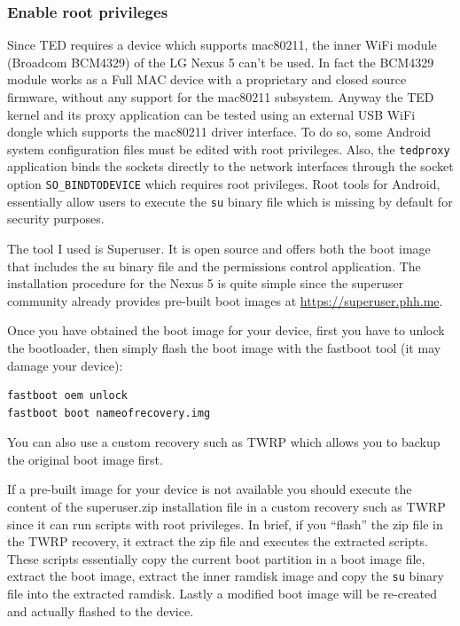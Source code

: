 \documentclass[a4paper]{article}
\begin{document}
\subsubsection{Enable root privileges}
Since TED requires a device which supports mac80211, 
the inner WiFi module (Broadcom BCM4329) of the LG Nexus 5 can't be used. 
In fact the BCM4329 module works as a Full MAC device with a proprietary and closed source firmware, 
without any support for the mac80211 subsystem.
Anyway the TED kernel and its proxy application can be tested using an external USB WiFi dongle which
 supports the mac80211 driver interface. To do so, some Android system configuration files must be
 edited with root privileges. Also, the \texttt{tedproxy} application binds the
sockets directly to the network interfaces through the socket option
\texttt{SO\_BINDTODEVICE} which requires root privileges. 
Root tools for Android, essentially allow users to execute the \texttt{su} binary
file which is missing by default for security purposes.

The tool I used is Superuser\cite{superuser}. It is
open source and offers both the boot image that includes the su binary file and the
permissions control application. The installation procedure for the Nexus 5 is
quite simple since the superuser community already provides pre-built boot
images at \url{https://superuser.phh.me}. 

Once you have obtained the boot image for your device, first you have to unlock the bootloader, then simply
 flash the boot image with the fastboot tool (it may damage your device):

\begin{lstlisting}
fastboot oem unlock
fastboot boot nameofrecovery.img
\end{lstlisting}
You can also use a custom recovery such as
TWRP\cite{twrp} which allows you to backup the original boot image
first. 

If a pre-built image for your device is not available you should execute the
content of the superuser.zip installation file in a custom recovery such as
TWRP since it can run scripts with root privileges. In brief, if you ``flash''
the zip file in the TWRP recovery, it extract the zip file and executes the
extracted scripts. These scripts essentially copy the current boot partition in
a boot image file, extract the boot image, extract the inner ramdisk image and copy
the \texttt{su} binary file into the extracted ramdisk. Lastly a modified boot image
will be re-created and actually flashed to the device. 
\end{document}
